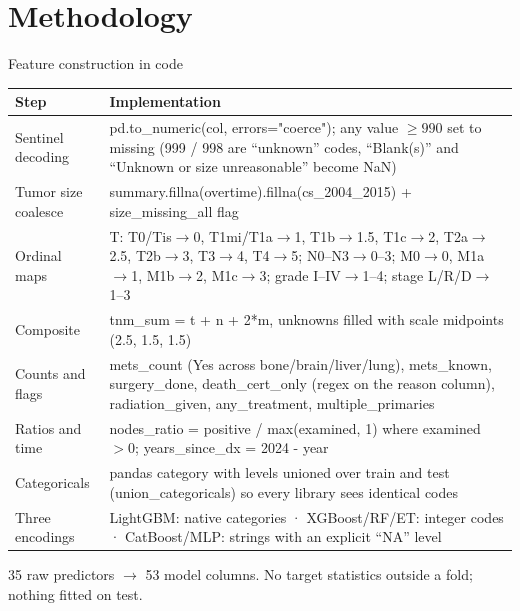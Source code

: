 \documentclass[aspectratio=169,10pt]{beamer}
\newcommand{\code}[1]{{\ttfamily #1}}
\begin{document}
\section{Methodology}

\begin{frame}{Feature construction in code}
  \scriptsize
  \begin{tabular}{@{}p{3.1cm}p{9.6cm}@{}}
    \toprule
    \textbf{Step} & \textbf{Implementation}\\
    \midrule
    Sentinel decoding & \code{pd.to\_numeric(col, errors="coerce")}; any value $\ge 990$ set to missing
      (999 / 998 are ``unknown'' codes, ``Blank(s)'' and ``Unknown or size unreasonable'' become NaN)\\
    Tumor size coalesce & \code{summary.fillna(overtime).fillna(cs\_2004\_2015)} + \code{size\_missing\_all} flag\\
    Ordinal maps & T: T0/Tis$\to$0, T1mi/T1a$\to$1, T1b$\to$1.5, T1c$\to$2, T2a$\to$2.5, T2b$\to$3, T3$\to$4, T4$\to$5;
      N0--N3$\to$0--3; M0$\to$0, M1a$\to$1, M1b$\to$2, M1c$\to$3; grade I--IV$\to$1--4; stage L/R/D$\to$1--3\\
    Composite & \code{tnm\_sum = t + n + 2*m}, unknowns filled with scale midpoints (2.5, 1.5, 1.5)\\
    Counts and flags & \code{mets\_count} (Yes across bone/brain/liver/lung), \code{mets\_known}, \code{surgery\_done},
      \code{death\_cert\_only} (regex on the reason column), \code{radiation\_given}, \code{any\_treatment}, \code{multiple\_primaries}\\
    Ratios and time & \code{nodes\_ratio = positive / max(examined, 1)} where examined $>0$; \code{years\_since\_dx = 2024 - year}\\
    Categoricals & pandas \code{category} with levels unioned over train and test
      (\code{union\_categoricals}) so every library sees identical codes\\
    Three encodings & LightGBM: native categories \;·\; XGBoost/RF/ET: integer codes \;·\; CatBoost/MLP: strings with an explicit ``NA'' level\\
    \bottomrule
  \end{tabular}
  \vspace{4pt}\par\tiny\color{mutedgray}
  35 raw predictors $\to$ 53 model columns. No target statistics outside a fold; nothing fitted on test.
\end{frame}
\end{document}
